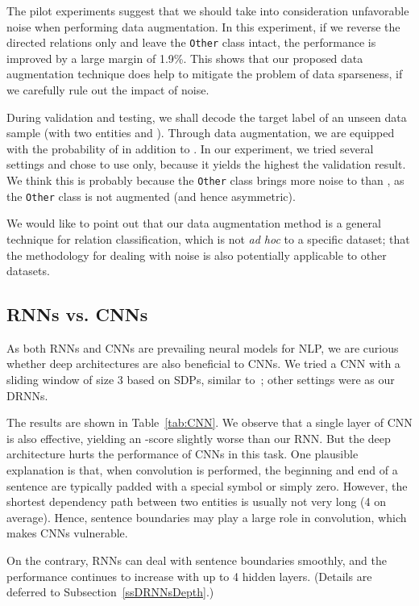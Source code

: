 \documentclass[11pt]{article}
\begin{document}
The pilot experiments suggest that we should take into consideration unfavorable noise when performing data augmentation. In this experiment, if we reverse the directed relations only and leave the {\tt Other} class intact, the performance is improved by a large margin of 1.9\%.
This shows that our proposed data augmentation technique does help to mitigate the problem of data sparseness, if we carefully rule out the impact of noise.

During validation and testing, we shall decode the target label of an unseen data sample (with two entities   and ). Through data augmentation, we are equipped with the probability of  in addition to . In our experiment, we tried several settings and chose to use  only, because it yields the highest the validation result. We think this is probably because the {\tt Other} class brings more noise to  than , as the {\tt Other} class is not augmented (and hence asymmetric).

We would like to point out that our data augmentation method is a general technique for relation classification, which is not \textit{ad hoc} to a specific dataset; that the methodology for dealing with noise is also potentially applicable to other datasets.




\subsection{RNNs vs. CNNs}\label{ssRNNCNN}

As both RNNs and CNNs are prevailing neural models for NLP, we are curious whether deep architectures are also beneficial to CNNs. We tried a CNN with a sliding window of size 3 based on SDPs, similar to~; other settings were as our DRNNs.

The results are shown in Table~\ref{tab:CNN}. We observe that a single layer of CNN is also effective, yielding an -score slightly worse than our RNN. But the deep architecture hurts the performance of CNNs in this task. One plausible explanation is that, when convolution is performed, the beginning and end of a sentence are typically padded with a special symbol or simply zero. However, the shortest dependency path between two entities is usually not very long (4 on average). Hence, sentence boundaries may play a large role in convolution, which makes CNNs vulnerable.

On the contrary, RNNs can deal with sentence boundaries smoothly, and the performance continues to increase with up to 4 hidden layers. (Details are deferred to Subsection~\ref{ssDRNNsDepth}.)
\end{document}
